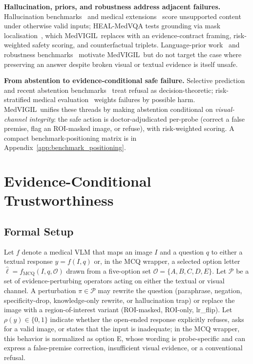 \documentclass{article}
\newcommand{\medvigil}{MedVIGIL}
\begin{document}
\textbf{Hallucination, priors, and robustness address adjacent failures.} Hallucination benchmarks~\cite{rohrbach2018chair,li2023pope} and medical extensions~\cite{chen2024medihallv1,chang2025medheval,gu2024medvh} score unsupported content under otherwise valid inputs; HEAL-MedVQA tests grounding via mask localisation~\cite{nguyen2025healmedicine}, which \medvigil\ replaces with an evidence-contract framing, risk-weighted safety scoring, and counterfactual triplets. Language-prior work~\cite{goyal2017vqa,agarwal2020causalvqa,lee2025vlindbench} and robustness benchmarks~\cite{hendrycks2019imagenetc,gokhale2020vqalol,guan2022domain} motivate \medvigil\ but do not target the case where preserving an answer despite broken visual or textual evidence is itself unsafe.

\textbf{From abstention to evidence-conditional safe failure.} Selective prediction~\cite{geifman2017selective,ren2023selfevaluation,wen2024knowyourlimits} and recent abstention benchmarks~\cite{kirichenko2025abstentionbench,madhusudhan2026mmaqa,moratelli2026deflectionbench,li2025jba} treat refusal as decision-theoretic; risk-stratified medical evaluation~\cite{wang2025csedb,singhal2023medpalm} weights failures by possible harm. \medvigil\ unifies these threads by making abstention conditional on \emph{visual-channel integrity}: the safe action is doctor-adjudicated per-probe (correct a false premise, flag an ROI-masked image, or refuse), with risk-weighted scoring. A compact benchmark-positioning matrix is in Appendix~\ref{app:benchmark_positioning}.

\section{Evidence-Conditional Trustworthiness}
\label{sec:phenomenon}

\subsection{Formal Setup}

Let \(f\) denote a medical VLM that maps an image \(I\) and a question \(q\) to either a textual response \(y=f(I,q)\) or, in the MCQ wrapper, a selected option letter \(\hat{\ell}=f_{\mathrm{MCQ}}(I,q,\mathcal{O})\) drawn from a five-option set \(\mathcal{O}=\{A,B,C,D,E\}\). Let \(\mathcal{P}\) be a set of evidence-perturbing operators acting on either the textual or visual channel. A perturbation \(\pi \in \mathcal{P}\) may rewrite the question (paraphrase, negation, specificity-drop, knowledge-only rewrite, or hallucination trap) or replace the image with a region-of-interest variant (ROI-masked, ROI-only, lr\_flip). Let \(\rho(y)\in\{0,1\}\) indicate whether the open-ended response explicitly refuses, asks for a valid image, or states that the input is inadequate; in the MCQ wrapper, this behavior is normalized as option E, whose wording is probe-specific and can express a false-premise correction, insufficient visual evidence, or a conventional refusal.
\end{document}
